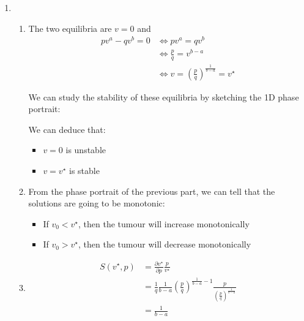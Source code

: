 \begin{enumerate}

\item 
\begin{enumerate}
	\item The two equilibria are $v = 0$ and 
	\begin{align*}
	pv^a - qv^b = 0 
		& \Leftrightarrow pv^a = qv^b \\	
		& \Leftrightarrow \frac{p}{q}= v^{b-a} \\
		& \Leftrightarrow v = \left(\frac{p}{q}\right)^{\frac{1}{b-a}} = v^\star
	\end{align*}

	We can study the stability of these equilibria by sketching the 1D phase portrait:
	
	\begin{center}
	\end{center}

	We can deduce that:
	\begin{itemize}
		\item $v=0$ is unstable
		\item $v=v^\star$ is stable
	\end{itemize}
	
	
	
	\item From the phase portrait of the previous part, we can tell that the solutions are going to be monotonic:
	\begin{itemize}
		\item If $v_0 < v^\star$, then the tumour will increase monotonically
		\item If $v_0 > v^\star$, then the tumour will decrease monotonically
	\end{itemize}
	
	
	\item 
	\begin{align*}
	S(v^\star,p) 
		& = \frac{\partial v^\star}{\partial p} \frac{p}{v^\star} \\
		& = \frac{1}{q} \frac{1}{b-a} \left(\frac{p}{q}\right)^{\frac{1}{b-a}-1} \frac{p}{\left(\frac{p}{q}\right)^{\frac{1}{b-a}}} \\
		& = \frac{1}{b-a}
	\end{align*}
	

\end{enumerate}
\end{enumerate}
